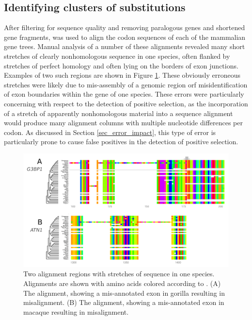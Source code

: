\subsection{Identifying clusters of \nsyn substitutions}
\label{section_windows_clustered_subs}

After filtering for sequence quality and removing paralogous genes and
shortened gene fragments, \prankc was used to align the codon
sequences of each of the \ntrees mammalian gene trees. Manual analysis
of a number of these alignments revealed many short stretches of
clearly nonhomologous sequence in one species, often flanked by
stretches of perfect homology and often lying on the borders of exon
junctions. Examples of two such regions are shown in Figure
\ref{fig_mammals_cluster_subs}.  These obviously erroneous stretches
were likely due to mis-assembly of a genomic region orf
misidentification of exon boundaries within the gene of one
species. These errors were particularly concerning with respect to the
detection of positive selection, as the incorporation of a stretch of
apparently nonhomologous material into a sequence alignment would
produce many alignment columns with multiple nucleotide differences
per codon. As discussed in Section \ref{sec_error_impact}, this type
of error is particularly prone to cause false positives in the
detection of positive selection.

\begin{figure}
\centering \includegraphics[scale=0.25]{Figs/mammals_cluster_subs.pdf}
\caption{Two alignment regions with stretches of \nhom sequence in one
  species. Alignments are shown with amino acids colored according to
  \citet{Taylor1975}. (A) The  alignment, showing a
  mis-annotated exon in gorilla resulting in misalignment. (B) The
   alignment, showing a mis-annotated exon in macaque
  resulting in misalignment.}
\label{fig_mammals_cluster_subs}
\end{figure}


